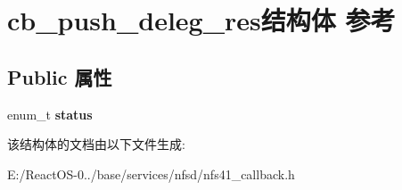 \hypertarget{structcb__push__deleg__res}{}\section{cb\+\_\+push\+\_\+deleg\+\_\+res结构体 参考}
\label{structcb__push__deleg__res}
\subsection*{Public 属性}
\begin{DoxyCompactItemize}
\item 
\mbox{\label{structcb__push__deleg__res_a8abd03952731f50f36196cdfd6e16e5a}} 
enum\+\_\+t {\bfseries status}
\end{DoxyCompactItemize}


该结构体的文档由以下文件生成\+:\begin{DoxyCompactItemize}
\item 
E\+:/\+React\+O\+S-\/0../base/services/nfsd/nfs41\+\_\+callback.\+h\end{DoxyCompactItemize}
